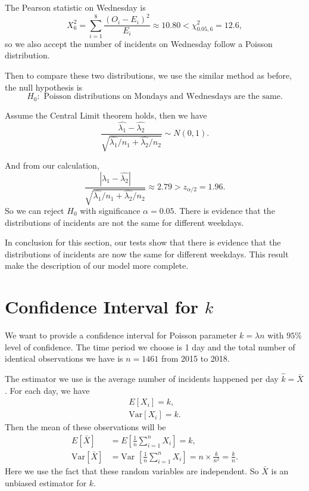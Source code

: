 \documentclass[11pt,a4paper,english]{article}
\begin{document}
The Pearson statistic on Wednesday is 
\begin{equation*}
	X^{2}_{6} = \sum_{i = 1}^{8}\frac{(O_{i}-E_{i})^{2}}{E_{i}} \approx 10.80 < \chi^{2}_{0.05,6} = 12.6,
\end{equation*}
so we also accept the number of incidents on Wednesday follow a Poisson distribution.

Then to compare these two distributions, we use the similar method as before, the null hypothesis is 
\begin{equation*}
	H_{0}:\text{ Poisson distributions on Mondays and Wednesdays are the same.}
\end{equation*}

Assume the Central Limit theorem holds, then we have
\begin{equation*}
	\frac{\hat{\lambda_{1}}-\hat{\lambda_{2}}}{\sqrt{\hat{\lambda_{1}}/{n_{1}} + \hat{\lambda_{2}}/{n_{2}}}} \sim N(0,1).
\end{equation*}

And from our calculation,
\begin{equation*}
	\frac{|\hat{\lambda_{1}}-\hat{\lambda_{2}}|}{\sqrt{\hat{\lambda_{1}}/{n_{1}} + \hat{\lambda_{2}}/{n_{2}}}} \approx 2.79 > z_{\alpha/2} = 1.96.
\end{equation*}
So we can reject $H_{0}$ with significance $\alpha = 0.05$. There is evidence that the distributions of incidents are not the same for different weekdays.

In conclusion for this section, our tests show that there is evidence that the distributions of incidents are now the same for different weekdays. This result make the description of our model more complete.
\section{Confidence Interval for $k$}
We want to provide a confidence interval for Poisson parameter $k = \lambda n$ with $95\%$ level of confidence. 
The time period we choose is 1 day and the total number of identical observations we have is $n = 1461$ from 2015 to 2018.

The estimator we use is the average number of incidents happened per day $\hat{k} = \bar{X}$.
For each day, we have 
\begin{align*}
	E[X_{i}] = k,\\
	\text{Var}[X_{i}] = k.
\end{align*}
Then the mean of these observations will be
\begin{align*}
	E[\bar{X}] &= E[\frac{1}{n}\sum_{i = 1}^{n}X_{i}] = k,\\
	\text{Var}[\bar{X}] &= \text{Var }[\frac{1}{n}\sum_{i = 1}^{n}X_{i}] = n \times \frac{k}{n^{2}} = \frac{k}{n}.
\end{align*}
Here we use the fact that these random variables are independent. So $\bar{X}$ is an unbiased estimator for $k$.
\end{document}
